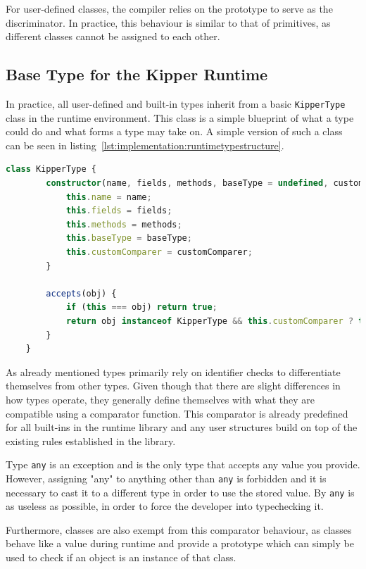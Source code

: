 For user-defined classes, the compiler relies on the prototype to serve as the discriminator. In practice, this behaviour is similar to that of primitives, as different classes cannot be assigned to each other.

\subsection{Base Type for the Kipper Runtime}
\label{subsec:basetype}

In practice, all user-defined and built-in types inherit from a basic \lstinline|KipperType| class in the runtime environment. This class is a simple blueprint of what a type could do and what forms a type may take on. A simple version of such a class can be seen in listing~\ref{lst:implementation:runtimetypestructure}.

\begin{lstlisting}[language=TypeScript,caption=The structure of a runtime type,label=lst:implementation:runtimetypestructure]
	class KipperType {
		constructor(name, fields, methods, baseType = undefined, customComparer = undefined) {
			this.name = name;
			this.fields = fields;
			this.methods = methods;
			this.baseType = baseType;
			this.customComparer = customComparer;
		}

		accepts(obj) {
			if (this === obj) return true;
			return obj instanceof KipperType && this.customComparer ? this.customComparer(this, obj) : false;
		}
	}
\end{lstlisting}

As already mentioned types primarily rely on identifier checks to differentiate themselves from other types. Given though that there are slight differences in how types operate, they generally define themselves with what they are compatible using a comparator function. This comparator is already predefined for all built-ins in the runtime library and any user structures build on top of the existing rules established in the library.

Type \lstinline|any| is an exception and is the only type that accepts any value you provide. However, assigning "any" to anything other than \lstinline|any| is forbidden and it is necessary to cast it to a different type in order to use the stored value. By  \lstinline|any| is as useless as possible, in order to force the developer into typechecking it.

Furthermore, classes are also exempt from this comparator behaviour, as classes behave like a value during runtime and provide a prototype which can simply be used to check if an object is an instance of that class.

